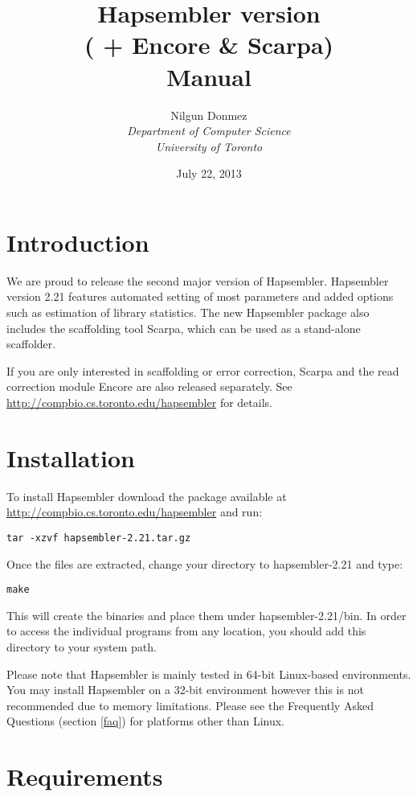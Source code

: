 \documentclass[12pt,a4paper]{report}
\title{Hapsembler version \hapversion{} \\ ( + Encore \& Scarpa) \\ Manual }
\author{Nilgun Donmez \\
\emph{Department of Computer Science} \\
\emph{University of Toronto} }
\date{July 22, 2013}
\newcommand{\hapversion}{2.21}
\begin{document}
\maketitle
\tableofcontents
\newpage

\renewcommand*\thesection{\arabic{section}}

\section{Introduction}

We are proud to release the second major version of Hapsembler. Hapsembler version \hapversion{} features automated setting of most parameters and added options such as estimation of library statistics. The new Hapsembler package also includes the scaffolding tool Scarpa, which can be used as a stand-alone scaffolder. 

If you are only interested in scaffolding or error correction, Scarpa and the read correction module Encore are also released separately. See \url{http://compbio.cs.toronto.edu/hapsembler} for details. 

\section{Installation}

To install Hapsembler download the package available at \url{http://compbio.cs.toronto.edu/hapsembler} and run:

\begin{verbatim}
tar -xzvf hapsembler-2.21.tar.gz
\end{verbatim}

Once the files are extracted, change your directory to hapsembler-\hapversion{} and type:

\begin{verbatim}
make
\end{verbatim}

This will create the binaries and place them under hapsembler-\hapversion{}/bin. In order to access the individual programs from any location, you should add this directory to your system path. 

Please note that Hapsembler is mainly tested in 64-bit Linux-based environments. You may install Hapsembler on a 32-bit environment however this is not recommended due to memory limitations. Please see the Frequently Asked Questions (section \ref{faq}) for platforms other than Linux.

\section{Requirements}
\end{document}
